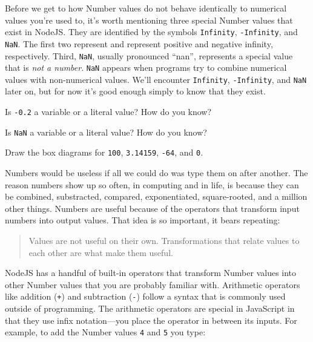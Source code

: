 Before we get to how \textsf{Number} values do not behave identically to
numerical values you're used to, it's worth mentioning three special
\textsf{Number} values that exist in NodeJS. They are identified by the symbols
\texttt{Infinity}, \texttt{-Infinity}, and \texttt{NaN}. The first two represent
and represent positive and negative infinity, respectively. Third, \texttt{NaN},
usually pronounced ``nan'', represents a special value that is \emph{not a
number}. \texttt{NaN} appears when programs try to combine numerical values with
non-numerical values. We'll encounter \texttt{Infinity}, \texttt{-Infinity}, and
\texttt{NaN} later on, but for now it's good enough simply to know that they
exist.

\begin{question}
  Is \texttt{-0.2} a variable or a literal value? How do you know?
\end{question}

\begin{question}
  Is \texttt{NaN} a variable or a literal value? How do you know?
\end{question}

\begin{question}
Draw the box diagrams for \texttt{100}, \texttt{3.14159}, \texttt{-64}, and
\texttt{0}.
\end{question}

Numbers would be useless if all we could do was type them on after another. The
reason numbers show up so often, in computing and in life, is because they can
be combined, substracted, compared, exponentiated, square-rooted, and a million
other things. Numbers are useful because of the operators that transform input
numbers into output values. That idea is so important, it bears repeating:

\begin{quotation}
Values are not useful on their own. Transformations that relate values to
each other are what make them useful.
\end{quotation}

NodeJS has a handful of built-in operators that transform \textsf{Number} values
into other \textsf{Number} values that you are probably familiar with.
Arithmetic operators like addition (\texttt{+}) and subtraction (\texttt{-})
follow a syntax that is commonly used outside of programming. The arithmetic
operators are special in JavaScript in that they use infix notation---you place
the operator in between its inputs. For example, to add the \textsf{Number}
values \texttt{4} and \texttt{5} you type:

